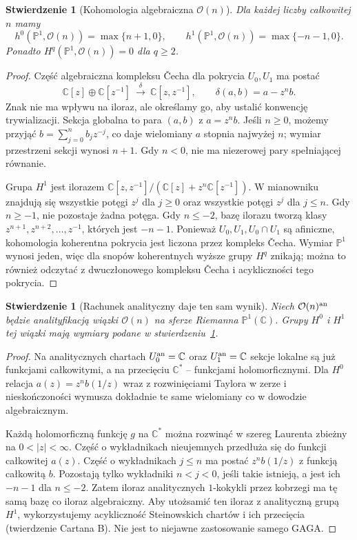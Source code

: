\documentclass[11pt,a4paper,openany]{report}
\numberwithin{equation}{section}
\theoremstyle{plain}
\newtheorem{stwierdzenie}[twierdzenie]{Stwierdzenie}
\theoremstyle{definition}
\theoremstyle{remark}
\newcommand{\C}{\mathbb C}
\newcommand{\PP}{\mathbb P}
\begin{document}
\begin{stwierdzenie}[Kohomologia algebraiczna $\mathcal O(n)$]
\label{st:ga9-p1-coh}
Dla każdej liczby całkowitej $n$ mamy
\[
 h^0(\PP^1,\mathcal O(n))=\max\{n+1,0\},\qquad
 h^1(\PP^1,\mathcal O(n))=\max\{-n-1,0\}.
\]
Ponadto $H^q(\PP^1,\mathcal O(n))=0$ dla $q\ge2$.
\end{stwierdzenie}
\begin{proof}
Część algebraiczna kompleksu Čecha dla pokrycia
$U_0,U_1$ ma postać
\[
 \C[z]\oplus\C[z^{-1}]
 \ \xrightarrow{\ \delta\ }\ \C[z,z^{-1}],\qquad
 \delta(a,b)=a-z^n b.
\]
Znak nie ma wpływu na iloraz, ale określamy go,
aby ustalić konwencję trywializacji. Sekcja globalna
to para $(a,b)$ z $a=z^n b$. Jeśli $n\ge0$,
możemy przyjąć $b=\sum_{j=0}^n b_jz^{-j}$,
co daje wielomiany $a$ stopnia najwyżej $n$;
wymiar przestrzeni sekcji wynosi $n+1$. Gdy $n<0$,
nie ma niezerowej pary spełniającej równanie.

Grupa $H^1$ jest ilorazem
$\C[z,z^{-1}]/(\C[z]+z^n\C[z^{-1}])$.
W mianowniku znajdują się wszystkie potęgi $z^j$
dla $j\ge0$ oraz wszystkie potęgi $z^j$ dla $j\le n$.
Gdy $n\ge-1$, nie pozostaje żadna potęga. Gdy
$n\le-2$, bazę ilorazu tworzą klasy
$z^{n+1},z^{n+2},\ldots,z^{-1}$, których jest $-n-1$.
Ponieważ $U_0,U_1,U_0\cap U_1$ są afiniczne,
kohomologia koherentna pokrycia jest liczona
przez kompleks Čecha. Wymiar $\PP^1$ wynosi jeden,
więc dla snopów koherentnych wyższe grupy $H^q$
znikają; można to również odczytać z dwuczłonowego
kompleksu Čecha i acykliczności tego pokrycia.
\end{proof}

\begin{stwierdzenie}[Rachunek analityczny daje ten sam wynik]
\label{st:ga9-p1-analytic}
Niech $\mathcal O(n)^{\rm an}$ będzie analityfikacją
wiązki $\mathcal O(n)$ na sferze Riemanna
$\PP^1(\C)$. Grupy $H^0$ i $H^1$ tej wiązki
mają wymiary podane w
stwierdzeniu~\ref{st:ga9-p1-coh}.
\end{stwierdzenie}
\begin{proof}
Na analitycznych chartach $U_0^{\rm an}=\C$ oraz
$U_1^{\rm an}=\C$ sekcje lokalne są już funkcjami
całkowitymi, a na przecięciu $\C^*$ -- funkcjami
holomorficznymi. Dla $H^0$ relacja
$a(z)=z^n b(1/z)$ wraz z rozwinięciami Taylora
w zerze i nieskończoności wymusza dokładnie
te same wielomiany co w dowodzie algebraicznym.

Każdą holomorficzną funkcję $g$ na $\C^*$ można
rozwinąć w szereg Laurenta zbieżny na
$0<|z|<\infty$. Część o wykładnikach nieujemnych
przedłuża się do funkcji całkowitej $a(z)$.
Część o wykładnikach $j\le n$ ma postać
$z^n b(1/z)$ z funkcją całkowitą $b$.
Pozostają tylko wykładniki $n<j<0$, jeśli takie
istnieją, a jest ich $-n-1$ dla $n\le-2$.
Zatem iloraz analitycznych $1$-kokykli przez
kobrzegi ma tę samą bazę co iloraz algebraiczny.
Aby utożsamić ten iloraz z analityczną grupą
$H^1$, wykorzystujemy acykliczność Steinowskich
chartów i ich przecięcia (twierdzenie Cartana B).
Nie jest to niejawne zastosowanie samego GAGA.
\end{proof}
\end{document}
